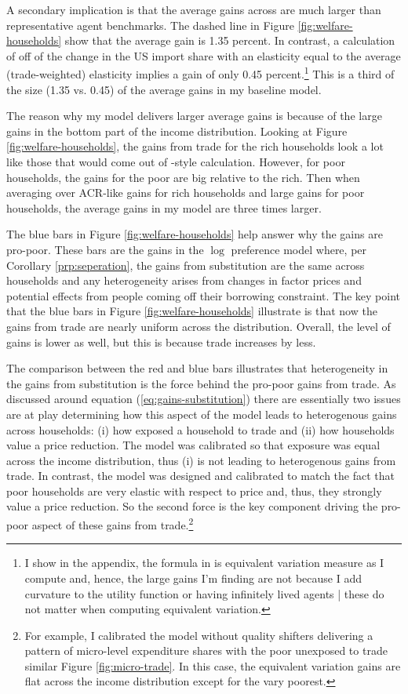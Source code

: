 \documentclass[12pt,pdftex]{article}
\begin{document}
\begin{onehalfspacing}
A secondary implication is that the average gains across are much larger than representative agent benchmarks. The dashed line in Figure \ref{fig:welfare-households} show that the average gain is 1.35 percent. In contrast, a calculation of \citet{arkolakis2012new} off of the change in the US import share with an elasticity equal to the average (trade-weighted) elasticity implies a gain of only 0.45 percent.\footnote{I show in the appendix, the formula in \citet{arkolakis2012new} is equivalent variation measure as I compute and, hence, the large gains I'm finding are not because I add curvature to the utility function or having infinitely lived agents | these do not matter when computing equivalent variation.} This is a third of the size (1.35 vs. 0.45) of the average gains in my baseline model.

The reason why my model delivers larger average gains is because of the large gains in the bottom part of the income distribution. Looking at Figure \ref{fig:welfare-households}, the gains from trade for the rich households look a lot like those that would come out of \citet{arkolakis2012new}-style calculation. However, for poor households, the gains for the poor are big relative to the rich. Then when averaging over ACR-like gains for rich households and large gains for poor households, the average gains in my model are three times larger.

The blue bars in Figure \ref{fig:welfare-households} help answer why the gains are pro-poor. These bars are the gains in the $\log$ preference model where, per Corollary \ref{prp:seperation}, the gains from substitution are the same across households and any heterogeneity arises from changes in factor prices and potential effects from people coming off their borrowing constraint. The key point that the blue bars in Figure \ref{fig:welfare-households} illustrate is that now the gains from trade are nearly uniform across the distribution. Overall, the level of gains is lower as well, but this is because trade increases by less.

The comparison between the red and blue bars illustrates that heterogeneity in the gains from substitution is the force behind the pro-poor gains from trade. As discussed around equation (\ref{eq:gains-substitution}) there are essentially two issues are at play determining how this aspect of the model leads to heterogenous gains across households: (i) how exposed a household to trade and (ii) how households value a price reduction. The model was calibrated so that exposure was equal across the income distribution, thus (i) is not leading to heterogenous gains from trade.  In contrast, the model was designed and calibrated to match the fact that poor households are very elastic with respect to price and, thus, they strongly value a price reduction. So the second force is the key component driving the pro-poor aspect of these gains from trade.\footnote{For example, I calibrated the model without quality shifters delivering a pattern of micro-level expenditure shares with the poor unexposed to trade similar Figure \ref{fig:micro-trade}. In this case, the equivalent variation gains are flat across the income distribution except for the vary poorest.}


\end{onehalfspacing}
\end{document}
